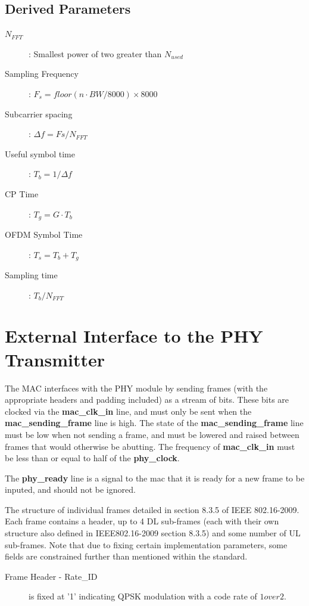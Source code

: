\documentclass[dvips,10pt,twocolumn]{article}
\begin{document}
\subsection{Derived Parameters}

\begin{description}
	\item[$N_{FFT}$]: Smallest power of two greater than $N_{used}$
	\item[Sampling Frequency]: $F_s = floor ( n \cdot BW / 8000 )
		\times 8000 $
	\item[Subcarrier spacing]: $\Delta f = F s / N_{FFT} $
	\item[Useful symbol time]: $T_b = 1 / \Delta f$
	\item[CP Time]: $T_g = G \cdot T_b$
	\item[OFDM Symbol Time]: $T_s = T_b + T_g$
	\item[Sampling time]: $T_b / N_{FFT}$
\end{description}


\section{External Interface to the PHY Transmitter}
\label{sec:frame}
The MAC interfaces with the PHY module by sending frames (with the
appropriate headers and padding included) as a stream of bits.  These bits
are clocked via the \textbf{mac\_clk\_in} line, and must only be sent when
the \textbf{mac\_sending\_frame} line is high.  The state of the
\textbf{mac\_sending\_frame} line must be low when not sending a frame, and
must be lowered and raised between frames that would otherwise be abutting.
The frequency of \textbf{mac\_clk\_in} must be less than or equal to half
of the \textbf{phy\_clock}.

The \textbf{phy\_ready} line is a signal to the mac that it is ready for a
new frame to be inputed, and should not be ignored.

The structure of individual frames detailed in section 8.3.5 of IEEE
802.16-2009.  Each frame contains a header, up to 4 DL sub-frames (each with
their own structure also defined in IEEE802.16-2009 section 8.3.5) and some
number of UL sub-frames.  Note that due to fixing certain implementation
parameters, some fields are constrained further than mentioned within the
standard.

\begin{description}
	\item[Frame Header - Rate\_ID] is fixed at '1' indicating QPSK
		modulation with a code rate of $1 over 2$.
	

\end{description}
\end{document}
